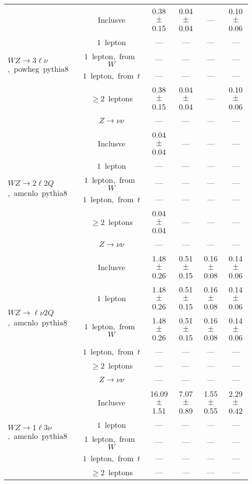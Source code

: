 \documentclass{article}
\begin{document}
\begin{longtable}{|l|c|c|c|c|c|}
\hline 
\multirow{6}{*}{$WZ{\rightarrow}3\ell\nu$,~powheg~pythia8} & Inclusve  & 0.38 $\pm$ 0.15  & 0.04 $\pm$ 0.04  & ---  & 0.10 $\pm$ 0.06 \\* 
 & $1$~lepton  & ---  & ---  & ---  & --- \\* 
 & $1$~lepton,~from~$W$  & ---  & ---  & ---  & --- \\* 
 & $1$~lepton,~from~$t$  & ---  & ---  & ---  & --- \\* 
 & $\ge2$~leptons  & 0.38 $\pm$ 0.15  & 0.04 $\pm$ 0.04  & ---  & 0.10 $\pm$ 0.06 \\* 
 & $Z\rightarrow\nu\nu$  & ---  & ---  & ---  & --- \\* 
\hline 
\multirow{6}{*}{$WZ{\rightarrow}2{\ell}2Q$,~amcnlo~pythia8} & Inclusve  & 0.04 $\pm$ 0.04  & ---  & ---  & --- \\* 
 & $1$~lepton  & ---  & ---  & ---  & --- \\* 
 & $1$~lepton,~from~$W$  & ---  & ---  & ---  & --- \\* 
 & $1$~lepton,~from~$t$  & ---  & ---  & ---  & --- \\* 
 & $\ge2$~leptons  & 0.04 $\pm$ 0.04  & ---  & ---  & --- \\* 
 & $Z\rightarrow\nu\nu$  & ---  & ---  & ---  & --- \\* 
\hline 
\multirow{6}{*}{$WZ{\rightarrow}{\ell}{\nu}2Q$,~amcnlo~pythia8} & Inclusve  & 1.48 $\pm$ 0.26  & 0.51 $\pm$ 0.15  & 0.16 $\pm$ 0.08  & 0.14 $\pm$ 0.06 \\* 
 & $1$~lepton  & 1.48 $\pm$ 0.26  & 0.51 $\pm$ 0.15  & 0.16 $\pm$ 0.08  & 0.14 $\pm$ 0.06 \\* 
 & $1$~lepton,~from~$W$  & 1.48 $\pm$ 0.26  & 0.51 $\pm$ 0.15  & 0.16 $\pm$ 0.08  & 0.14 $\pm$ 0.06 \\* 
 & $1$~lepton,~from~$t$  & ---  & ---  & ---  & --- \\* 
 & $\ge2$~leptons  & ---  & ---  & ---  & --- \\* 
 & $Z\rightarrow\nu\nu$  & ---  & ---  & ---  & --- \\* 
\hline 
\multirow{6}{*}{$WZ{\rightarrow}1{\ell}3{\nu}$,~amcnlo~pythia8} & Inclusve  & 16.09 $\pm$ 1.51  & 7.07 $\pm$ 0.89  & 1.55 $\pm$ 0.55  & 2.29 $\pm$ 0.42 \\* 
 & $1$~lepton  & ---  & ---  & ---  & --- \\* 
 & $1$~lepton,~from~$W$  & ---  & ---  & ---  & --- \\* 
 & $1$~lepton,~from~$t$  & ---  & ---  & ---  & --- \\* 
 & $\ge2$~leptons  & ---  & ---  & ---  & --- \\* 

\end{longtable}
\end{document}
